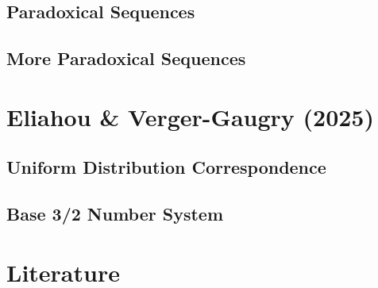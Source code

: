 \section{Paradoxical Sequences}


\section{More Paradoxical Sequences}


\chapter{Eliahou \& Verger-Gaugry (2025)}
\section{Uniform Distribution Correspondence}


\section{Base 3/2 Number System}


\chapter{Literature}


\newpage
